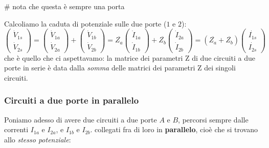 \documentclass[a4paper,11pt]{article}
\begin{document}
# nota che questa è sempre una porta

Calcoliamo la caduta di potenziale sulle due porte ($1$ e $2$):
$$
\begin{pmatrix}
	\dot{V}_{1s} \\ \dot{V}_{2s}
\end{pmatrix}
=
\begin{pmatrix}
	\dot{V}_{1a} \\ \dot{V}_{2a}
\end{pmatrix}
+
\begin{pmatrix}
	\dot{V}_{1b} \\ \dot{V}_{2b}
\end{pmatrix}
=
\overline{Z_{a}} 
\begin{pmatrix}
	\dot{I}_{1a} \\ \dot{I}_{1b}
\end{pmatrix}
+
\overline{Z_{b}}
\begin{pmatrix}
	\dot{I}_{2a} \\ \dot{I}_{2b}
\end{pmatrix}
=
\left( \overline{Z_a} + \overline{Z_b} \right) 
\begin{pmatrix}
	\dot{I_{1s}} \\ \dot{I_{2s}}
\end{pmatrix}
$$
che è quello che ci aspettavamo: la matrice dei parametri Z di due circuiti a due porte in serie è data dalla \textit{somma} delle matrici dei parametri Z dei singoli circuiti.

\subsubsection{Circuiti a due porte in parallelo}
Poniamo adesso di avere due circuiti a due porte $A$ e $B$, percorsi sempre dalle correnti $I_{1a}$ e $I_{2a}$, e $I_{1b}$ e $I_{2b}$. collegati fra di loro in \textbf{parallelo}, cioè che si trovano allo \textit{stesso potenziale}:
\end{document}
